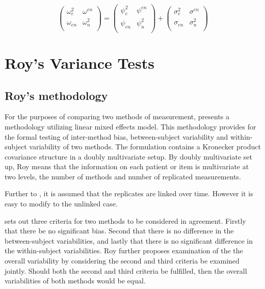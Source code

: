 \documentclass[12pt, a4paper]{report}
\theoremstyle{plain}
\theoremstyle{definition}
\theoremstyle{remark}
\begin{document}
			\begin{equation}
				\left( \begin{array}{cc}
					\omega^2_{e} & \omega^{en} \\
					\omega_{en} & \omega^2_{n} \\
				\end{array}\right)
				=
				\left( \begin{array}{cc}
					\psi^2_{e} & \psi^{en} \\
					\psi_{en} & \psi^2_{n} \\
				\end{array}\right)
				+
				\left( \begin{array}{cc}
					\sigma^2_{e} & \sigma^{en} \\
					\sigma_{en} & \sigma^2_{n} \\
				\end{array}\right)
			\end{equation}
	

	\newpage
	
	

\chapter{Roy's Variance Tests}
\section{Roy's methodology}

For the purposes of comparing two methods of measurement, \citet{roy} presents a methodology utilizing linear mixed effects model. This methodology provides for the formal testing of inter-method bias, between-subject variability and within-subject variability of two methods. The formulation contains a Kronecker product covariance structure in a doubly multivariate setup. By doubly multivariate set up, Roy means that the information on each patient or item is multivariate at two levels, the number of methods and number of replicated measurements. 

Further to \citet{lam}, it is assumed that the replicates are linked over time. However it is easy to modify to the unlinked case.

\citet{roy} sets out three criteria for two methods to be considered in agreement. Firstly that there be no significant bias. Second that there is no difference in the between-subject variabilities, and lastly that there is no significant difference in the within-subject variabilities. Roy further proposes examination of the the overall variability by considering the second and third criteria be examined jointly. Should both the second and third criteria be fulfilled, then the overall variabilities of both methods would be equal.
\end{document}
